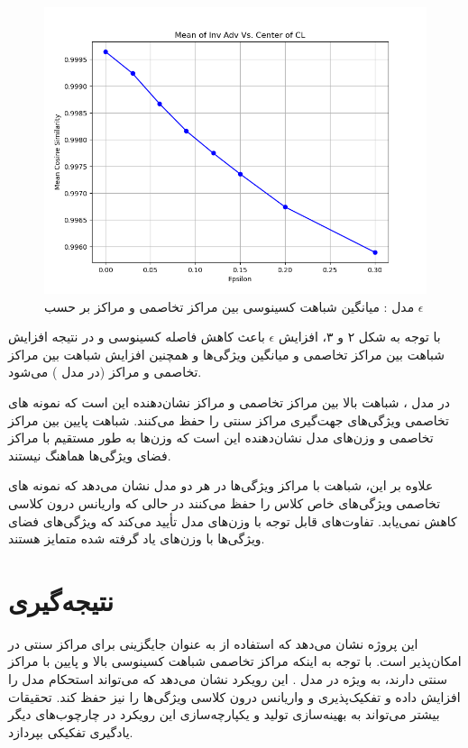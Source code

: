 \documentclass{article}
\begin{document}
\begin{figure}[h]
    \centering
    \begin{minipage}[b]{0.45\textwidth}
        \centering
        \includegraphics[width=\textwidth]{cl-CL.png}
    \end{minipage}
    \caption{
مدل :  میانگین شباهت کسینوسی بین مراکز تخاصمی و مراکز  بر حسب $\epsilon$    
    }
    \label{fig:three-images}
\end{figure}


با توجه به شکل ۲ و ۳، افزایش $\epsilon$
باعث کاهش فاصله کسینوسی و در نتیجه افزایش شباهت بین مراکز تخاصمی و میانگین ویژگی‌ها و همچنین افزایش شباهت بین مراکز تخاصمی و مراکز  (در مدل ) می‌شود.

    در مدل ، شباهت بالا بین مراکز تخاصمی و مراکز  نشان‌دهنده این است که نمونه های تخاصمی ویژگی‌های جهت‌گیری مراکز سنتی را حفظ می‌کنند.
   شباهت پایین بین مراکز تخاصمی و وزن‌های مدل نشان‌دهنده این است که وزن‌ها به طور مستقیم با مراکز فضای ویژگی‌ها هماهنگ نیستند.

علاوه بر این، شباهت با مراکز ویژگی‌ها در هر دو مدل نشان می‌دهد که نمونه های تخاصمی ویژگی‌های خاص کلاس را حفظ می‌کنند در حالی که واریانس درون کلاسی کاهش نمی‌یابد. تفاوت‌های قابل توجه با وزن‌های مدل تأیید می‌کند که ویژگی‌های فضای ویژگی‌ها با وزن‌های یاد گرفته شده متمایز هستند.


\section{نتیجه‌گیری}
این پروژه نشان می‌دهد که استفاده از  به عنوان جایگزینی برای مراکز سنتی در  امکان‌پذیر است.
با توجه به اینکه مراکز تخاصمی شباهت کسینوسی بالا و  پایین با مراکز سنتی  دارند، به ویژه در مدل .
این رویکرد نشان می‌دهد که می‌تواند استحکام مدل را افزایش داده و تفکیک‌پذیری و واریانس درون کلاسی ویژگی‌ها را نیز حفظ کند.
تحقیقات بیشتر می‌تواند به بهینه‌سازی تولید  و یکپارچه‌سازی این رویکرد در چارچوب‌های دیگر یادگیری تفکیکی بپردازد.
\end{document}
